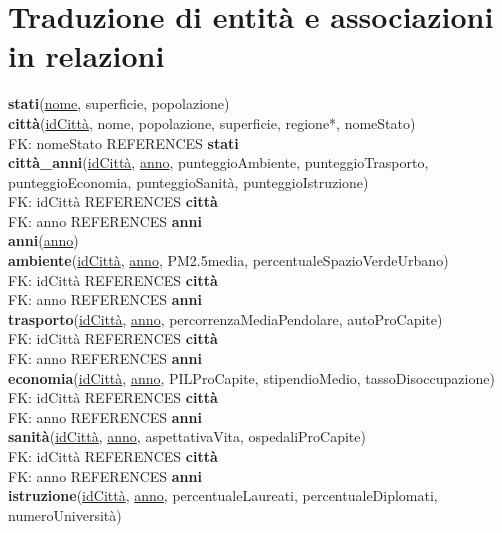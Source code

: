 \documentclass[a4paper,12pt]{report}
\begin{document}
        \section{Traduzione di entità e associazioni in relazioni}
        \onehalfspacing
        \textbf{stati}(\underline{nome}, superficie, popolazione) \\
        \textbf{città}(\underline{idCittà}, nome, popolazione, superficie, regione*, nomeStato) \\ 
            \null\quad\quad FK: nomeStato REFERENCES \textbf{stati} \\
        \textbf{città\_anni}(\underline{idCittà}, \underline{anno}, punteggioAmbiente, punteggioTrasporto, punteggioEconomia, punteggioSanità, punteggioIstruzione) \\
            \null\quad\quad FK: idCittà REFERENCES \textbf{città} \\
            \null\quad\quad FK: anno REFERENCES \textbf{anni} \\
        \textbf{anni}(\underline{anno}) \\
        \textbf{ambiente}(\underline{idCittà}, \underline{anno}, PM2.5media, percentualeSpazioVerdeUrbano) \\
            \null\quad\quad FK: idCittà REFERENCES \textbf{città} \\
            \null\quad\quad FK: anno REFERENCES \textbf{anni} \\
        \textbf{trasporto}(\underline{idCittà}, \underline{anno}, percorrenzaMediaPendolare, autoProCapite) \\
            \null\quad\quad FK: idCittà REFERENCES \textbf{città} \\
            \null\quad\quad FK: anno REFERENCES \textbf{anni} \\
        \textbf{economia}(\underline{idCittà}, \underline{anno}, PILProCapite, stipendioMedio, tassoDisoccupazione) \\
            \null\quad\quad FK: idCittà REFERENCES \textbf{città} \\
            \null\quad\quad FK: anno REFERENCES \textbf{anni} \\
        \textbf{sanità}(\underline{idCittà}, \underline{anno}, aspettativaVita, ospedaliProCapite) \\
            \null\quad\quad FK: idCittà REFERENCES \textbf{città} \\
            \null\quad\quad FK: anno REFERENCES \textbf{anni} \\
        \textbf{istruzione}(\underline{idCittà}, \underline{anno}, percentualeLaureati, percentualeDiplomati, numeroUniversità) \\
\end{document}
